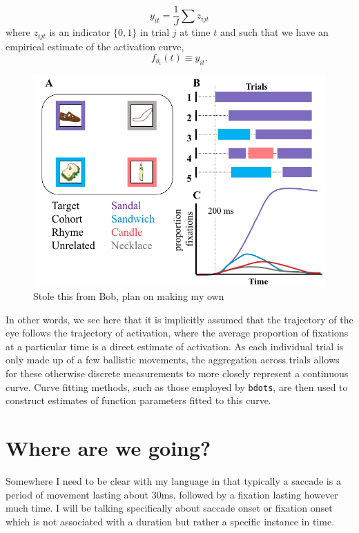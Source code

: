 \documentclass{article}
\newcommand{\xt}{\texttt}%
\begin{document}
\begin{equation}
y_{it} = \frac1J \sum z_{ijt}
\end{equation}
where $z_{ijt}$ is an indicator $\{0, 1\}$ in trial $j$ at time $t$ and such that we have an empirical estimate of the activation curve,
\begin{equation}
f_{\theta_i}(t) \equiv y_{it}.
\end{equation}


\begin{figure}
\centering
\includegraphics[scale=0.45]{bob_vwp_full.png}
\caption{Stole this from Bob, plan on making my own}
\label{fig:bob_diagram_full}
\end{figure}

In other words, we see here that it is implicitly assumed that the trajectory of the eye follows the trajectory of activation, where the average proportion of fixations at a particular time is a direct estimate of activation. As each individual trial is only made up of a few ballistic movements, the aggregation across trials allows for these otherwise discrete measurements to more closely represent a continuous curve. Curve fitting methods, such as those employed by \xt{bdots}, are then used to construct estimates of function parameters fitted to this curve.

\section{Where are we going?} 

Somewhere I need to be clear with my language in that typically a saccade is a period of movement lasting about 30ms, followed by a fixation lasting however much time. I will be talking specifically about saccade onset or fixation onset which is not associated with a duration but rather a specific instance in time.
\end{document}
